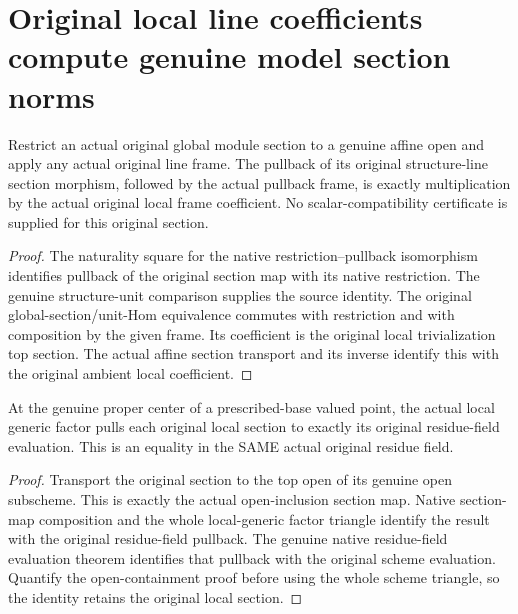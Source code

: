 \section{Original local line coefficients compute genuine model section norms}

\begin{lemma}
\label{lem:fc-original-local-section-scalar}
\leanok
{}
Restrict an actual original global module section to a genuine affine open
and apply any actual original line frame.  The pullback of its original
structure-line section morphism, followed by the actual pullback frame, is
exactly multiplication by the actual original local frame coefficient.
No scalar-compatibility certificate is supplied for this original section.
\end{lemma}
\begin{proof}
The naturality square for the native restriction--pullback isomorphism
identifies pullback of the original section map with its native restriction.
The genuine structure-unit comparison supplies the source identity.
The original global-section/unit-Hom equivalence commutes with restriction
and with composition by the given frame.  Its coefficient is the original
local trivialization top section.  The actual affine section transport and
its inverse identify this with the original ambient local coefficient.
\end{proof}

\begin{lemma}
\label{lem:fc-original-local-section-residue-value}
\leanok
{}
At the genuine proper center of a prescribed-base valued point, the actual
local generic factor pulls each original local section to exactly its
original residue-field evaluation.  This is an equality in the SAME actual
original residue field.
\end{lemma}
\begin{proof}
Transport the original section to the top open of its genuine open subscheme.
This is exactly the actual open-inclusion section map.  Native section-map
composition and the whole local-generic factor triangle identify the
result with the original residue-field pullback.  The genuine native
residue-field evaluation theorem identifies that pullback with the original
scheme evaluation.  Quantify the open-containment proof before using the
whole scheme triangle, so the identity retains the original local section.
\end{proof}

